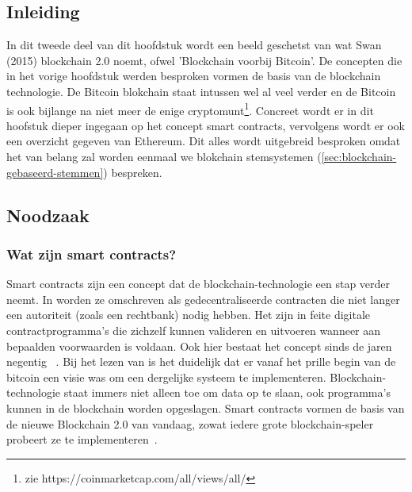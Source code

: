 	\subsection*{Inleiding}
		In dit tweede deel van dit hoofdstuk wordt een beeld geschetst van wat Swan (2015) blockchain 2.0 noemt, ofwel 'Blockchain voorbij Bitcoin'. De concepten die in het vorige hoofdstuk werden besproken vormen de basis van de blockchain technologie. De Bitcoin blokchain staat intussen wel al veel verder en de Bitcoin is ook bijlange na niet meer de enige cryptomunt\footnote{zie https://coinmarketcap.com/all/views/all/}.  Concreet wordt er in dit hoofstuk dieper ingegaan op het concept  smart contracts, vervolgens wordt er ook een overzicht gegeven van Ethereum. Dit alles wordt uitgebreid besproken omdat het van belang zal worden eenmaal we blokchain stemsystemen (\ref{sec:blockchain-gebaseerd-stemmen}) bespreken.
	\subsection{Noodzaak}
		\subsubsection{Wat  zijn smart contracts?}
			Smart contracts zijn een concept dat de blockchain-technologie een stap verder neemt. In \textcite{Swan2015} worden ze omschreven als gedecentraliseerde contracten die niet langer een autoriteit (zoals een rechtbank) nodig hebben. Het zijn in feite digitale contractprogramma’s die zichzelf kunnen valideren en uitvoeren wanneer aan bepaalden voorwaarden is voldaan. Ook hier bestaat het concept sinds de jaren negentig ~\autocite{Szabo1996}. Bij het lezen van \textcite{Nakamoto2008} is het duidelijk dat er vanaf het prille begin van de bitcoin een visie was om een dergelijke systeem te implementeren. Blockchain-technologie staat immers niet alleen toe om data op te slaan, ook programma’s kunnen in de blockchain worden opgeslagen. Smart contracts vormen de basis van de nieuwe Blockchain 2.0 van vandaag, zowat iedere grote blockchain-speler probeert ze te implementeren~\autocite{Swan2015}.
